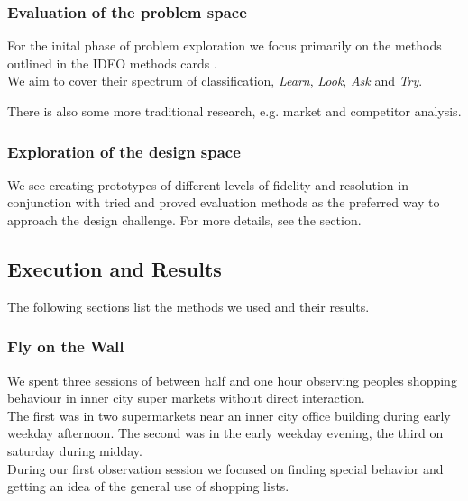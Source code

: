 \documentclass{scrartcl}
\begin{document}
    \subsubsection{Evaluation of the problem space}
      For the inital phase of problem exploration we focus primarily on the methods outlined in the IDEO methods cards \cite{TODO}.\\
      We aim to cover their spectrum of classification, \textit{Learn}, \textit{Look}, \textit{Ask} and \textit{Try}.

      There is also some more traditional research, e.g. market and competitor analysis.

    \subsubsection{Exploration of the design space}
      We see creating prototypes of different levels of fidelity and resolution in conjunction with tried and proved evaluation methods as the preferred way to approach the design challenge. 
      For more details, see the  section.

  \subsection{Execution and Results}
    The following sections list the methods we used and their results.

    \subsubsection{Fly on the Wall}
      We spent three sessions of between half and one hour observing peoples shopping behaviour in inner city super markets without direct interaction.\\
      The first was in two supermarkets near an inner city office building during early weekday afternoon.
      The second was in the early weekday evening, the third on saturday during midday.\\

      During our first observation session we focused on finding special behavior and getting an idea of the general use of shopping lists.\\
\end{document}
